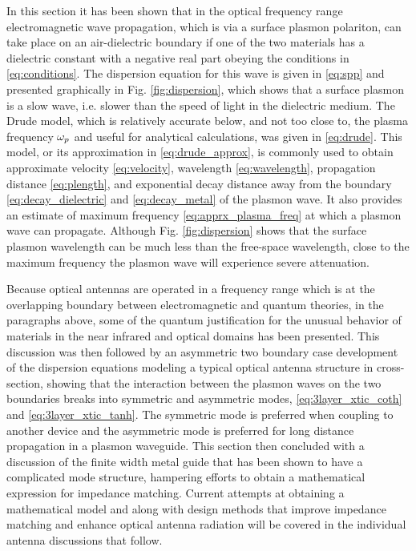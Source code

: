 In this section it has been shown that in the optical frequency range electromagnetic wave propagation, which is via a surface plasmon polariton, can take place on an air-dielectric boundary if one of the two materials has a dielectric constant with a negative real part obeying the conditions in \eqref{eq:conditions}. The dispersion equation for this wave is given in \eqref{eq:spp} and presented graphically in Fig. \ref{fig:dispersion}, which shows that a surface plasmon is a slow wave, i.e. slower than the speed of light in the dielectric medium. The Drude model, which is relatively accurate below, and not too close to, the plasma frequency $\omega_p$ and useful for analytical calculations, was given in \eqref{eq:drude}. This model, or its approximation in \eqref{eq:drude_approx}, is commonly used to obtain approximate velocity \eqref{eq:velocity}, wavelength \eqref{eq:wavelength}, propagation distance \eqref{eq:plength}, and exponential decay distance away from the boundary \eqref{eq:decay_dielectric} and
\eqref{eq:decay_metal} of the plasmon wave. It also provides an estimate of maximum frequency \eqref{eq:apprx_plasma_freq} at which a plasmon wave can propagate. Although Fig. \ref{fig:dispersion} shows that the surface plasmon wavelength can be much less than the free-space wavelength, close to the maximum frequency the plasmon wave will experience severe attenuation.

Because optical antennas are operated in a frequency range which is at the overlapping boundary between electromagnetic and quantum theories, in the paragraphs above, some of the quantum justification for the unusual behavior of materials in the near infrared and optical domains has been presented. This discussion was then followed by an asymmetric two boundary case development of the dispersion equations modeling a typical optical antenna structure in cross-section, showing that the interaction between the plasmon waves on the two boundaries breaks into symmetric and asymmetric modes, \eqref{eq:3layer_xtic_coth} and \eqref{eq:3layer_xtic_tanh}. The symmetric mode is preferred when coupling to another device and the asymmetric mode is preferred for long distance propagation in a plasmon waveguide. This section then concluded with a discussion of the finite width metal guide that has been shown to have a complicated mode structure, hampering efforts to obtain a mathematical expression for impedance matching. Current attempts at obtaining a mathematical model and along with design methods that improve impedance matching and enhance optical antenna radiation will be covered in the individual antenna discussions that follow.
